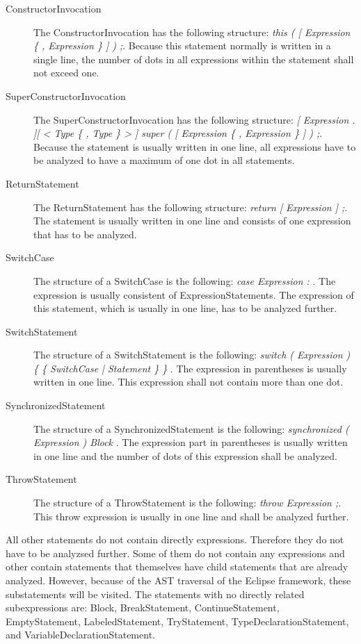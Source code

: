 \begin{description}
  \item[ConstructorInvocation] The ConstructorInvocation has the following structure: \textit{this ( [ Expression \{ , Expression \} ] ) ;}. Because this statement normally is written in a single line, the number of dots in all expressions within the statement shall not exceed one.
  \item[SuperConstructorInvocation] The SuperConstructorInvocation has the following structure: \textit{[ Expression . ][ < Type \{ , Type \} > ] super ( [ Expression \{ , Expression \} ] ) ;}. Because the statement is usually written in one line, all expressions have to be analyzed to have a maximum of one dot in all statements.
  \item[ReturnStatement] The ReturnStatement has the following structure: \textit{return [ Expression ] ;}. The statement is usually written in one line and consists of one expression that has to be analyzed.
  \item[SwitchCase] The structure of a SwitchCase is the following: \textit{ case Expression  : }. The expression is usually consistent of ExpressionStatements. The expression of this statement, which is usually in one line, has to be analyzed further.
  \item[SwitchStatement] The structure of a SwitchStatement is the following: \textit{ switch ( Expression ) \{ \{ SwitchCase | Statement \} \} }. The expression in parentheses is usually written in one line. This expression shall not contain more than one dot.
  \item[SynchronizedStatement] The structure of a SynchronizedStatement is the following: \textit{  synchronized ( Expression ) Block }. The expression part in parentheses is usually written in one line and the number of dots of this expression shall be analyzed.
  \item[ThrowStatement] The structure of a ThrowStatement is the following: \textit{throw Expression ;}. This throw expression is usually in one line and shall be analyzed further.
\end{description}

All other statements do not contain directly expressions. Therefore they do not have to be analyzsed further. Some of them do not contain any expressions and other contain statements that themselves have child statements that are already analyzed. However, because of the \ac{AST} traversal of the Eclipse framework, these substatements will be visited. The statements with no directly related subexpressions are: Block, BreakStatement, ContinueStatement, EmptyStatement, LabeledStatement, TryStatement, TypeDeclarationStatement, and VariableDeclarationStatement.
\\

